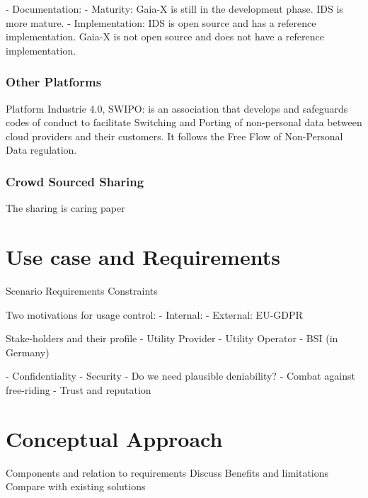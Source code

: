 \documentclass{article}
\begin{document}
- Documentation: 
- Maturity: Gaia-X is still in the development phase. IDS is more mature.
- Implementation: IDS is open source and has a reference implementation. Gaia-X is not open source and does not have a reference implementation.



\subsubsection*{Other Platforms}
Platform Industrie 4.0, 
SWIPO: is an association that develops and safeguards codes of conduct to facilitate Switching and Porting of non-personal data between cloud providers and their customers.
It follows the Free Flow of Non-Personal Data regulation.

\subsubsection*{Crowd Sourced Sharing}
The sharing is caring paper \cite{jesus_sharing_2023}

\section{Use case and Requirements} %
Scenario
Requirements
Constraints

Two motivations for usage control:
- Internal: 
- External: EU-GDPR

Stake-holders and their profile
- Utility Provider
- Utility Operator
- BSI (in Germany)

- Confidentiality
- Security
- Do we need plausible deniability?
- Combat against free-riding
- Trust and reputation


\section{Conceptual Approach} %

Components and relation to requirements
Discuss Benefits and limitations
Compare with existing solutions
\end{document}
